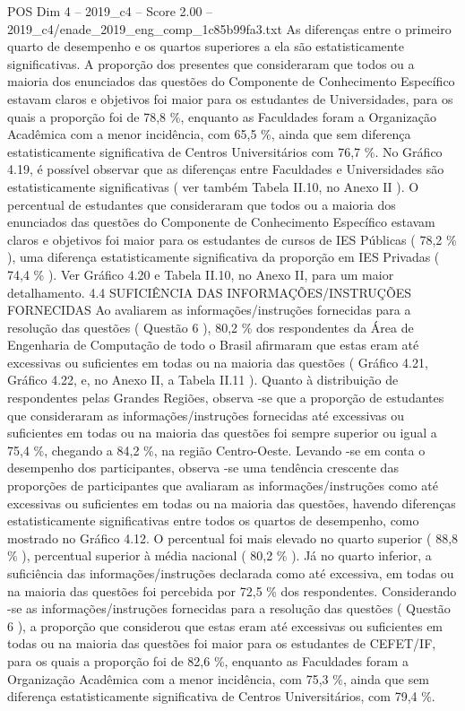 \begin{textsample}{POS Dim 4 – 2019\_c4 – Score 2.00 – 2019\_c4/enade\_2019\_eng\_comp\_1c85b99fa3.txt}
As diferenças entre o primeiro quarto de desempenho e os quartos superiores a ela são estatisticamente significativas.
A proporção dos presentes que consideraram que todos ou a maioria dos enunciados das questões do Componente de Conhecimento Específico estavam claros e objetivos foi maior para os estudantes de Universidades, para os quais a proporção foi de 78,8 \%, enquanto as Faculdades foram a Organização Acadêmica com a menor incidência, com 65,5 \%, ainda que sem diferença estatisticamente significativa de Centros Universitários com 76,7 \%.
No Gráfico 4.19, é possível observar que as diferenças entre Faculdades e Universidades são estatisticamente significativas ( ver também Tabela II.10, no Anexo II ).
O percentual de estudantes que consideraram que todos ou a maioria dos enunciados das questões do Componente de Conhecimento Específico estavam claros e objetivos foi maior para os estudantes de cursos de IES Públicas ( 78,2 \% ), uma diferença estatisticamente significativa da proporção em IES Privadas ( 74,4 \% ).
Ver Gráfico 4.20 e Tabela II.10, no Anexo II, para um maior detalhamento. 4.4 SUFICIÊNCIA DAS INFORMAÇÕES/INSTRUÇÕES FORNECIDAS Ao avaliarem as informações/instruções fornecidas para a resolução das questões ( Questão 6 ), 80,2 \% dos respondentes da Área de Engenharia de Computação de todo o Brasil afirmaram que estas eram até excessivas ou suficientes em todas ou na maioria das questões ( Gráfico 4.21, Gráfico 4.22, e, no Anexo II, a Tabela II.11 ).
Quanto à distribuição de respondentes pelas Grandes Regiões, observa -se que a proporção de estudantes que consideraram as informações/instruções fornecidas até excessivas ou suficientes em todas ou na maioria das questões foi sempre superior ou igual a 75,4 \%, chegando a 84,2 \%, na região Centro-Oeste.
Levando -se em conta o desempenho dos participantes, observa -se uma tendência crescente das proporções de participantes que avaliaram as informações/instruções como até excessivas ou suficientes em todas ou na maioria das questões, havendo diferenças estatisticamente significativas entre todos os quartos de desempenho, como mostrado no Gráfico 4.12.
O percentual foi mais elevado no quarto superior ( 88,8 \% ), percentual superior à média nacional ( 80,2 \% ).
Já no quarto inferior, a suficiência das informações/instruções declarada como até excessiva, em todas ou na maioria das questões foi percebida por 72,5 \% dos respondentes.
Considerando -se as informações/instruções fornecidas para a resolução das questões ( Questão 6 ), a proporção que considerou que estas eram até excessivas ou suficientes em todas ou na maioria das questões foi maior para os estudantes de CEFET/IF, para os quais a proporção foi de 82,6 \%, enquanto as Faculdades foram a Organização Acadêmica com a menor incidência, com 75,3 \%, ainda que sem diferença estatisticamente significativa de Centros Universitários, com 79,4 \%.

\end{textsample}
